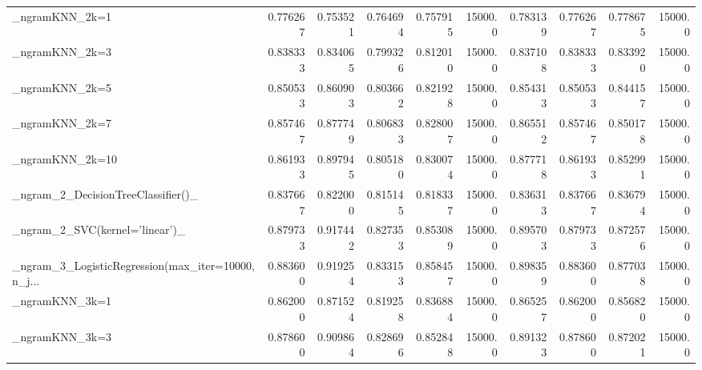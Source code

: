 \begin{tabular}{lrrrrrrrrr}
\_ngramKNN\_2k=1                                     &  0.776267 &         0.753521 &      0.764694 &        0.757915 &        15000.0 &            0.783139 &         0.776267 &           0.778675 &           15000.0 \\
\_ngramKNN\_2k=3                                     &  0.838333 &         0.834065 &      0.799326 &        0.812010 &        15000.0 &            0.837108 &         0.838333 &           0.833920 &           15000.0 \\
\_ngramKNN\_2k=5                                     &  0.850533 &         0.860903 &      0.803662 &        0.821928 &        15000.0 &            0.854313 &         0.850533 &           0.844157 &           15000.0 \\
\_ngramKNN\_2k=7                                     &  0.857467 &         0.877749 &      0.806833 &        0.828007 &        15000.0 &            0.865512 &         0.857467 &           0.850178 &           15000.0 \\
\_ngramKNN\_2k=10                                    &  0.861933 &         0.897945 &      0.805180 &        0.830074 &        15000.0 &            0.877718 &         0.861933 &           0.852991 &           15000.0 \\
\_ngram\_2\_DecisionTreeClassifier()\_                 &  0.837667 &         0.822000 &      0.815145 &        0.818337 &        15000.0 &            0.836313 &         0.837667 &           0.836794 &           15000.0 \\
\_ngram\_2\_SVC(kernel='linear')\_                     &  0.879733 &         0.917442 &      0.827353 &        0.853089 &        15000.0 &            0.895703 &         0.879733 &           0.872576 &           15000.0 \\
\_ngram\_3\_LogisticRegression(max\_iter=10000, n\_j... &  0.883600 &         0.919254 &      0.833153 &        0.858457 &        15000.0 &            0.898359 &         0.883600 &           0.877038 &           15000.0 \\
\_ngramKNN\_3k=1                                     &  0.862000 &         0.871524 &      0.819258 &        0.836884 &        15000.0 &            0.865257 &         0.862000 &           0.856820 &           15000.0 \\
\_ngramKNN\_3k=3                                     &  0.878600 &         0.909864 &      0.828696 &        0.852848 &        15000.0 &            0.891323 &         0.878600 &           0.872021 &           15000.0 \\

\end{tabular}
